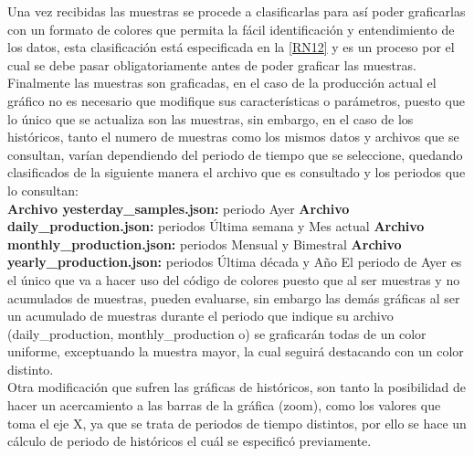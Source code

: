 Una vez recibidas las muestras se procede a clasificarlas para así poder graficarlas con un formato de colores que permita la fácil identificación y entendimiento de los datos, esta clasificación está especificada en la \ref{RN12} y es un proceso por el cual se debe pasar obligatoriamente antes de poder graficar las muestras. \\ \newline
Finalmente las muestras son graficadas, en el caso de la producción actual el gráfico no es necesario que modifique sus características o parámetros, puesto que lo único que se actualiza son las muestras, sin embargo, en el caso de los históricos, tanto el numero de muestras como los mismos datos y archivos que se consultan, varían dependiendo del periodo de tiempo que se seleccione, quedando clasificados de la siguiente manera el archivo que es consultado y los periodos que lo consultan: \\ \newline
\newline
\textbf{Archivo yesterday\_samples.json: }periodo Ayer \newline
\textbf{Archivo daily\_production.json: }periodos Última semana y Mes actual \newline
\textbf{Archivo monthly\_production.json: }periodos Mensual y Bimestral \newline
\textbf{Archivo yearly\_production.json: }periodos Última década y Año \newline
\newline
El periodo de Ayer es el único que va a hacer uso del código de colores puesto que al ser muestras y no acumulados de muestras, pueden evaluarse, sin embargo las demás gráficas al ser un acumulado de muestras durante el periodo que indique su archivo (daily\_production, monthly\_production o) se graficarán todas de un color uniforme, exceptuando la muestra mayor, la cual seguirá destacando con un color distinto. \\ \newline
Otra modificación que sufren las gráficas de históricos, son tanto la posibilidad de hacer un acercamiento a las barras de la gráfica (zoom), como los valores que toma el eje X, ya que se trata de periodos de tiempo distintos, por ello se hace un cálculo de periodo de históricos el cuál se especificó previamente.

